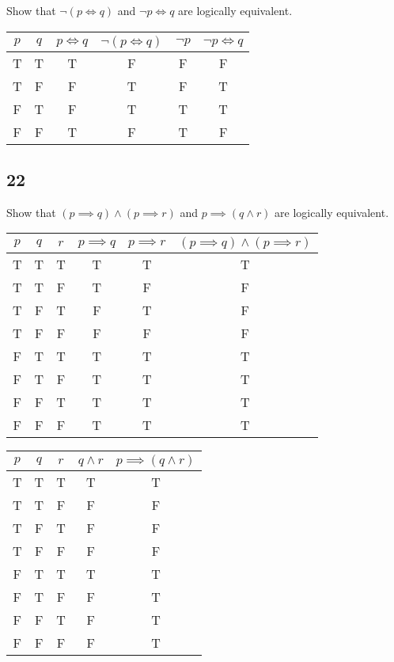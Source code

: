 \documentclass{article}
\begin{document}
Show that $ \neg ( p \iff q ) $ and $ \neg p \iff q $ are logically equivalent.

\begin{tabular}{ | c | c | c | c | c | c | }
	$ p $ & $ q $ & $ p \iff q $ & $ \neg ( p \iff q ) $ & $ \neg p $ & $ \neg p \iff q $ \\
	\hline
	T & T & T & F & F & F \\
	T & F & F & T & F & T \\
	F & T & F & T & T & T \\
	F & F & T & F & T & F
\end{tabular}

\subsection{22}

Show that $ ( p \implies q ) \land ( p \implies r ) $ and $ p \implies ( q \land r ) $ are logically equivalent.

\begin{tabular}{ | c | c | c | c | c | c | }
	$ p $ & $ q $ & $ r $ & $ p \implies q $ & $ p \implies r $ & $ ( p \implies q ) \land ( p \implies r ) $ \\
	\hline
	T & T & T & T & T & T \\
	T & T & F & T & F & F \\
	T & F & T & F & T & F \\
	T & F & F & F & F & F \\
	F & T & T & T & T & T \\
	F & T & F & T & T & T \\
	F & F & T & T & T & T \\
	F & F & F & T & T & T \\
\end{tabular}

\begin{tabular}{ | c | c | c | c | c | }
	$ p $ & $ q $ & $ r $ & $ q \land r $ & $ p \implies ( q \land r ) $ \\
	\hline
	T & T & T & T & T \\
	T & T & F & F & F \\
	T & F & T & F & F \\
	T & F & F & F & F \\
	F & T & T & T & T \\
	F & T & F & F & T \\
	F & F & T & F & T \\
	F & F & F & F & T \\
\end{tabular}
\end{document}
